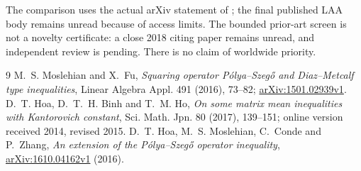 \documentclass[11pt]{article}
\begin{document}
The comparison uses the actual arXiv statement of \cite{MF}; the final
published LAA body remains unread because of access limits. The bounded prior-art
screen is not a novelty certificate: a close 2018 citing paper remains unread,
and independent review is pending. There is no claim of worldwide priority.

\small
\begin{thebibliography}{9}
 M.~S. Moslehian and X.~Fu,
\emph{Squaring operator P\'olya--Szeg\H{o} and Diaz--Metcalf type inequalities},
Linear Algebra Appl. 491 (2016), 73--82;
\href{https://arxiv.org/abs/1501.02939v1}{arXiv:1501.02939v1}.
 D.~T. Hoa, D.~T.~H. Binh and T.~M. Ho,
\emph{On some matrix mean inequalities with Kantorovich constant},
Sci. Math. Jpn. 80 (2017), 139--151; online version received 2014, revised 2015.
 D.~T. Hoa, M.~S. Moslehian, C.~Conde and P.~Zhang,
\emph{An extension of the P\'olya--Szeg\H{o} operator inequality},
\href{https://arxiv.org/abs/1610.04162v1}{arXiv:1610.04162v1} (2016).
\end{thebibliography}
\end{document}
